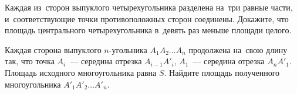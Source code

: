 \begin{problems}

\item
Каждая из~сторон выпуклого четырехугольника разделена на~три равные части,
и~соответствующие точки противоположных сторон соединены.
Докажите, что площадь центрального четырехугольника в~девять раз меньше площади
целого.

\item
Каждая сторона выпуклого $n$-угольника $A_{1}A_{2}{\ldots}A_{n}$ продолжена
на~свою длину так, что точка $A_{i}$~--- середина отрезка $A_{i-1} A'_{i}$,
$A_{1}$~--- середина отрезка $A_{n}A'_{1}$.
Площадь исходного многоугольника равна $S$.
Найдите площадь полученного многоугольника $A'_{1}A'_{2}{\ldots}A'_{n}$.

\end{problems}

